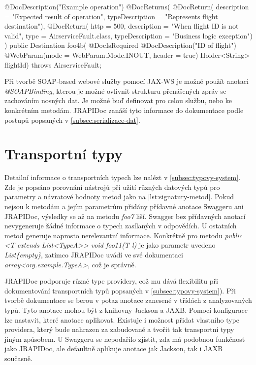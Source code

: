 \documentclass[11pt,twoside,a4paper]{book}
\begin{document}
\begin{code}[frame=single, caption={SOAP-based webové služby metoda s užitím JRAPIDoc
anotací}, label={lst:soap-metoda-jrapidoc-ukazka}] 
@DocDescription("Example operation") 
@DocReturns({
  @DocReturn(
    description = "Expected result of operation", 
    typeDescription = "Represents flight destination"), 
  @DocReturn(
    http = 500, 
    description = "When flight ID is not valid", 
    type = AirserviceFault.class, 
    typeDescription = "Business logic exception")
}) 
public Destination foo4b(
  @DocIsRequired 
  @DocDescription("ID of flight")
  @WebParam(mode = WebParam.Mode.INOUT, header = true) 
  Holder<String> flightId) throws AirserviceFault;
\end{code}

Při tvorbě SOAP-based webové služby pomocí JAX-WS je možné použít anotaci {\em
@SOAPBinding}, kterou je možné ovlivnit strukturu přenášených zpráv se
zachováním nosných dat. Je možné buď definovat pro celou službu, nebo ke
konkrétním metodám. JRAPIDoc zanáší tyto informace do dokumentace podle postupů
popsaných v \ref{subsec:serializace-dat}.

\section{Transportní typy}

Detailní informace o transportních typech lze nalézt v
\ref{subsec:typovy-system}.
Zde je popsáno porovnání nástrojů při užití různých datových typů pro parametry
a návratové hodnoty metod jako na \ref{lst:signatury-metod}. Pokud nejsou k
metodám a jejím parametrům přidány přídavné anotace Swaggeru ani JRAPIDoc,
výsledky se až na metodu {\em foo7} liší. Swagger bez přídavných anotací
nevygeneruje žádné informace o typech zasílaných v odpovědích. U ostatních metod
generuje naprosto nerelevantní informace. Konkrétně pro metodu {\em public <T
extends List<TypeA>> void foo11(T l)} je jako parametr uvedeno {\em
List\{empty\}}, zatímco JRAPIDoc uvádí ve své dokumentaci {\em
array<org.example.TypeA>}, což je správně.

JRAPIDoc podporuje různé type providery, což mu dává flexibilitu při
dokumentování transportních typů popsaných v \ref{subsec:typovy-system}). Při
tvorbě dokumentace se berou v potaz anotace zanesené v třídách z analyzovaných
typů. Tyto anotace mohou být z knihovny Jackson a JAXB. Pomocí konfigurace lze
nastavit, které anotace aplikovat. Existuje i možnost přidat vlastního type
providera, který bude nahrazen za zabudované a tvořit tak transportní typy jiným
způsobem.
U Swaggeru se nepodařilo zjistit, zda má podobnou funkčnost jako JRAPIDoc, ale
defaultně aplikuje anotace jak Jackson, tak i JAXB současně.
\end{document}

